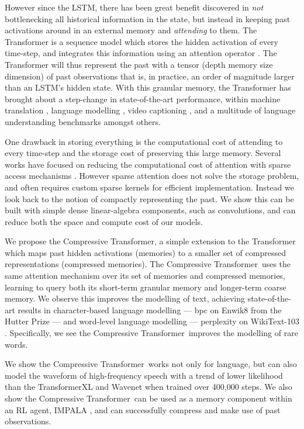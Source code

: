 \documentclass{article} \usepackage{iclr2020_conference,times}
\newcommand{\model}{Compressive Transformer}
\begin{document}
However since the LSTM, there has been great benefit discovered in \textit{not} bottlenecking all historical information in the state, but instead in keeping past activations around in an external memory and \textit{attending} to them. The Transformer \citep{vaswani2017attention} is a sequence model which stores the hidden activation of every time-step, and integrates this information using an attention operator \citep{bahdanau2014neural}. The Transformer will thus represent the past with a tensor (depth  memory size  dimension) of past observations that is, in practice, an order of magnitude larger than an LSTM's hidden state.  With this granular memory, the Transformer has brought about a step-change in state-of-the-art performance, within machine translation \citep{vaswani2017attention}, language modelling \citep{dai2019transformer, shoeybi2019megatronlm}, video captioning \citep{zhou2018end}, and a multitude of language understanding benchmarks \citep{devlin2018bert, yang2019xlnet} amongst others.

One drawback in storing everything is the computational cost of attending to every time-step and the storage cost of preserving this large memory. Several works have focused on reducing the computational cost of attention with sparse access mechanisms \citep{rae2016scaling, child2019generating, sukhbaatar2019adaptive, lample2019large}. However sparse attention does not solve the storage problem, and often requires custom sparse kernels for efficient implementation. Instead we look back to the notion of compactly representing the past. We show this can be built with simple dense linear-algebra components, such as convolutions, and can reduce both the space and compute cost of our models.

We propose the \model, a simple extension to the Transformer which maps past hidden activations (memories) to a smaller set of compressed representations (compressed memories). The \model~uses the same attention mechanism over its set of memories and compressed memories, learning to query both its short-term granular memory and longer-term coarse memory. We observe this improves the modelling of text, achieving state-of-the-art results in character-based language modelling ---  bpc on Enwik8 from the Hutter Prize \citep{hutter2012human} --- and word-level language modelling ---  perplexity on WikiText-103 \citep{merity2016pointer}. Specifically, we see the \model~improves the modelling of rare words.

We show the \model~works not only for language, but can also model the waveform of high-frequency speech with a trend of lower likelihood than the TransformerXL and Wavenet \citep{oord2016wavenet} when trained over 400,000 steps. We also show the \model~can be used as a memory component within an RL agent, IMPALA \citep{espeholt2018impala}, and can successfully compress and make use of past observations.
\end{document}
